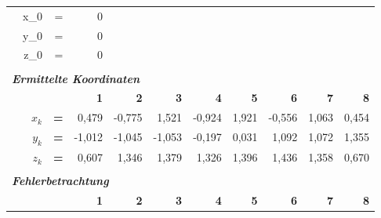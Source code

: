 \begin{table}[h]
\begin{tabular}{r|rrr|r|r|r|r|rrr}
    \multicolumn{1}{r}{} & x\_0  & =     & \multicolumn{1}{r}{0} & \multicolumn{1}{r}{} & \multicolumn{1}{r}{} & \multicolumn{1}{r}{} & \multicolumn{1}{r}{} &       &       &  \\
    \multicolumn{1}{r}{} & y\_0  & =     & \multicolumn{1}{r}{0} & \multicolumn{1}{r}{} & \multicolumn{1}{r}{} & \multicolumn{1}{r}{} & \multicolumn{1}{r}{} &       &       &  \\
    \multicolumn{1}{r}{} & z\_0  & =     & \multicolumn{1}{r}{0} & \multicolumn{1}{r}{} & \multicolumn{1}{r}{} & \multicolumn{1}{r}{} & \multicolumn{1}{r}{} &       &       &  \\
    \multicolumn{1}{r}{} &       &       & \multicolumn{1}{r}{} & \multicolumn{1}{r}{} & \multicolumn{1}{r}{} & \multicolumn{1}{r}{} & \multicolumn{1}{r}{} &       &       &  \\
    \multicolumn{11}{l}{\textit{\textbf{Ermittelte Koordinaten}}} \\
    \multicolumn{1}{r}{\textit{\textbf{}}} &       &       & \multicolumn{1}{r}{\textbf{1}} & \multicolumn{1}{r}{\textbf{2}} & \multicolumn{1}{r}{\textbf{3}} & \multicolumn{1}{r}{\textbf{4}} & \multicolumn{1}{r}{\textbf{5}} & \textbf{6} & \textbf{7} & \textbf{8} \\
\cline{2-11}    \multicolumn{1}{r}{} & ${x_k}$ & \textbf{=} & \multicolumn{1}{r}{0,479} & \multicolumn{1}{r}{-0,775} & \multicolumn{1}{r}{1,521} & \multicolumn{1}{r}{-0,924} & \multicolumn{1}{r}{1,921} & -0,556 & 1,063 & 0,454 \\
    \multicolumn{1}{r}{} & ${y_k}$ & \textbf{=} & \multicolumn{1}{r}{-1,012} & \multicolumn{1}{r}{-1,045} & \multicolumn{1}{r}{-1,053} & \multicolumn{1}{r}{-0,197} & \multicolumn{1}{r}{0,031} & 1,092 & 1,072 & 1,355 \\
    \multicolumn{1}{r}{} & ${z_k}$ & \textbf{=} & \multicolumn{1}{r}{0,607} & \multicolumn{1}{r}{1,346} & \multicolumn{1}{r}{1,379} & \multicolumn{1}{r}{1,326} & \multicolumn{1}{r}{1,396} & 1,436 & 1,358 & 0,670 \\
    \multicolumn{1}{r}{} &       &       & \multicolumn{1}{r}{} & \multicolumn{1}{r}{} & \multicolumn{1}{r}{} & \multicolumn{1}{r}{} & \multicolumn{1}{r}{} &       &       &  \\
    \multicolumn{11}{l}{\textit{\textbf{Fehlerbetrachtung}}} \\
    \multicolumn{1}{r}{} &       &       & \multicolumn{1}{r}{\textbf{1}} & \multicolumn{1}{r}{\textbf{2}} & \multicolumn{1}{r}{\textbf{3}} & \multicolumn{1}{r}{\textbf{4}} & \multicolumn{1}{r}{\textbf{5}} & \textbf{6} & \textbf{7} & \textbf{8} \\

\end{tabular}
\end{table}
